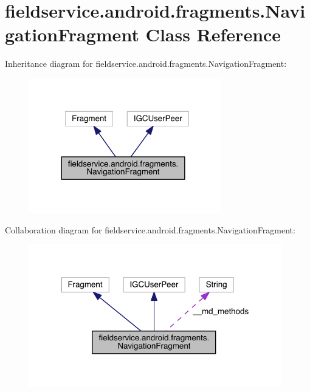 \hypertarget{classfieldservice_1_1android_1_1fragments_1_1_navigation_fragment}{\section{fieldservice.\+android.\+fragments.\+Navigation\+Fragment Class Reference}
\label{classfieldservice_1_1android_1_1fragments_1_1_navigation_fragment}
}


Inheritance diagram for fieldservice.\+android.\+fragments.\+Navigation\+Fragment\+:
\nopagebreak
\begin{figure}[H]
\begin{center}
\leavevmode
\includegraphics[width=237pt]{classfieldservice_1_1android_1_1fragments_1_1_navigation_fragment__inherit__graph}
\end{center}
\end{figure}


Collaboration diagram for fieldservice.\+android.\+fragments.\+Navigation\+Fragment\+:
\nopagebreak
\begin{figure}[H]
\begin{center}
\leavevmode
\includegraphics[width=311pt]{classfieldservice_1_1android_1_1fragments_1_1_navigation_fragment__coll__graph}
\end{center}
\end{figure}
